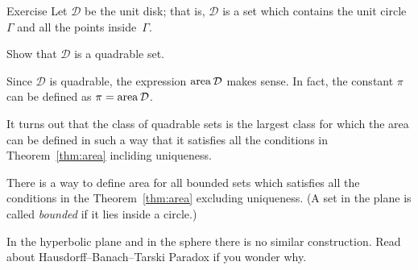 \begin{thm}{Exercise}\label{ex:circle-is-quadrable}
Let $\mathcal{D}$ be the unit disk;
that is, $\mathcal{D}$ is a set which contains 
the unit circle $\Gamma$ and all the points inside~$\Gamma$.

Show that $\mathcal{D}$ is a quadrable set.
\end{thm}

Since $\mathcal{D}$ is quadrable, 
the expression $\mathop{\rm area}\nolimits\mathcal{D}$ makes sense.
In fact, the constant $\pi$ can be defined as 
$\pi=\mathop{\rm area}\nolimits\mathcal{D}$.

\medskip

It turns out that the class of quadrable sets is the largest class for which 
the area can be defined in such a way that it satisfies all the conditions in Theorem~\ref{thm:area} incliding uniqueness.

There is a way to define area for all bounded sets
which satisfies all the conditions in the Theorem~\ref{thm:area} excluding uniqueness.
(A set in the plane is called \emph{bounded} if it lies inside a circle.)

In the hyperbolic plane and in the sphere
there is no similar construction.
Read about Hausdorff--Banach--Tarski Paradox
if you wonder why.


